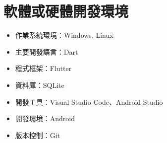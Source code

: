 \section{軟體或硬體開發環境}

\begin{itemize}
  \item 作業系統環境：Windows, Linux
  \item 主要開發語言：Dart
  \item 程式框架：Flutter
  \item 資料庫：SQLite
  \item 開發工具：Visual Studio Code、Android Studio
  \item 開發環境：Android
  \item 版本控制：Git
\end{itemize}